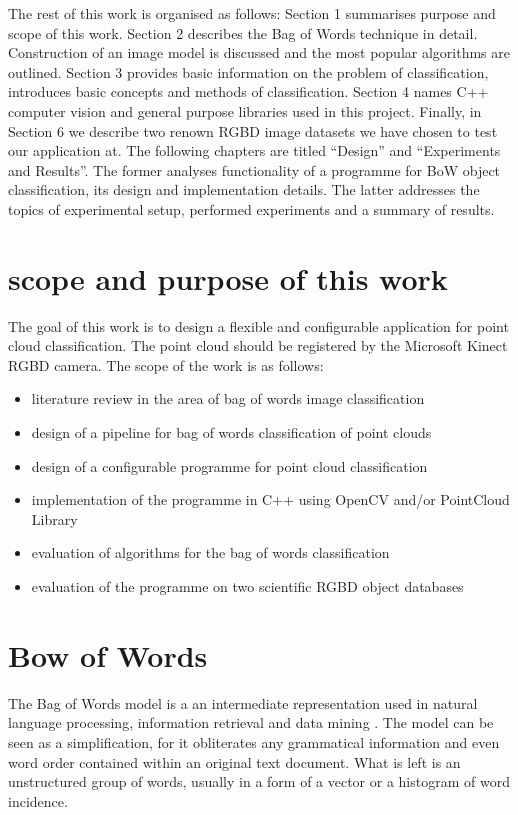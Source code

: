 	The rest of this work is organised as follows: Section 1 summarises purpose and scope of this work. Section 2 describes the Bag of Words technique in detail. Construction of an image model is discussed and the most popular algorithms are outlined. Section 3 provides basic information on the problem of classification, introduces basic concepts and methods of classification. Section 4 names C++ computer vision and general purpose libraries used in this project. Finally, in Section 6 we describe two renown RGBD image datasets we have chosen to test our application at. The following chapters are titled ``Design'' and ``Experiments and Results''. The former analyses functionality of a programme for BoW object classification, its design and implementation details. The latter addresses the topics of experimental setup, performed experiments and a summary of results.
	
	\section{scope and purpose of this work}
		The goal of this work is to design a flexible and configurable application for point cloud classification. The point cloud should be registered by the Microsoft Kinect RGBD camera. The scope of the work is as follows:
		\begin{itemize}
		\item literature review in the area of bag of words image classification
		\item design of a pipeline for bag of words classification of point clouds
		\item design of a configurable programme for point cloud classification
		\item implementation of the programme in C++ using OpenCV and/or PointCloud Library
		\item evaluation of algorithms for the bag of words classification
		\item evaluation of the programme on two scientific RGBD object databases
		\end{itemize} 
	
\section{Bow of Words}

	The Bag of Words model is a an intermediate representation used in natural language processing, information retrieval and data mining . The model can be seen as a simplification, for it obliterates any grammatical information and even word order contained within an original text document. What is left is an unstructured group of words, usually in a form of a vector or a histogram of word incidence.

